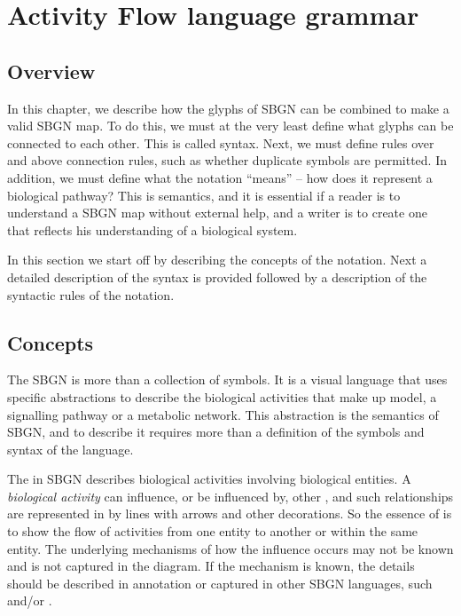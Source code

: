 \chapter{Activity Flow language grammar}
\label{chp:af:grammar}

\section{Overview}
In this chapter, we describe how the glyphs of SBGN \AF can be combined to make a valid SBGN \AF map. To do this, we must at the very least define what glyphs can be connected to each other. This is called syntax. Next, we must define rules over and above connection rules, such as whether duplicate symbols are permitted. In addition, we must define what the notation ``means'' -- how does it represent a biological pathway? This is semantics, and it is essential if a reader is to understand a SBGN map without external help, and a writer is to create one that reflects his understanding of a biological system.

In this section we start off by describing the concepts of the \AF{} notation. Next a detailed description of the syntax is provided
followed by a description of the syntactic rules of the notation.

\section{Concepts}

The SBGN \AF{} is more than a collection of symbols. It is a visual language that uses specific abstractions to describe the biological activities that make up  model, a signalling pathway or a metabolic network. This abstraction is the semantics of SBGN, and to describe it requires more than a definition of the symbols and syntax of the language. 

The \AF{} in SBGN describes biological activities involving biological entities. A \emph{biological activity} can influence, or be influenced by, other , and such relationships are represented in \AF by lines with arrows and other decorations. So the essence of \AF is to show the flow of activities from one entity to another or within the same entity. The underlying mechanisms of how the influence occurs may not be known and is not captured in the diagram. If the mechanism is known, the details should be described in annotation or captured in other SBGN languages, such \PD and/or \ER.





